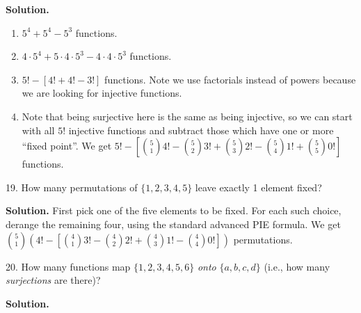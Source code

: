 \documentclass[10pt,]{book}
\theoremstyle{plain}
\theoremstyle{definition}
\theoremstyle{definition}
\theoremstyle{definition}
\numberwithin{equation}{section}
\begin{document}
\begin{exerciselist}
\par\smallskip
\par\smallskip
\noindent\textbf{Solution.}\hypertarget{solution-170}{}\quad

          \leavevmode%
\begin{enumerate}[label=(\alph*)]
\item\hypertarget{li-757}{}\(5^4 + 5^4 - 5^3\) functions. %
\item\hypertarget{li-758}{}\(4\cdot 5^4 + 5 \cdot 4 \cdot 5^3 - 4 \cdot 4 \cdot 5^3\) functions.%
\item\hypertarget{li-759}{}\(5! - \left[ 4! + 4! - 3! \right]\) functions.  Note we use factorials instead of powers because we are looking for injective functions.%
\item\hypertarget{li-760}{}Note that being surjective here is the same as being injective, so we can start with all \(5!\) injective functions and subtract those which have one or more ``fixed point''.  We get \(5! - \left[{5 \choose 1}4! - {5 \choose 2}3! + {5 \choose 3}2! - {5 \choose 4}1! + {5 \choose 5} 0!\right]\) functions.%
\end{enumerate}

\item[19.]\hypertarget{exercise-120}{}
            How many permutations of \(\{1,2,3,4,5\}\) leave exactly 1 element fixed?
\par\smallskip
\par\smallskip
\noindent\textbf{Solution.}\hypertarget{solution-171}{}\quad
 First pick one of the five elements to be fixed.  For each such choice, derange the remaining four, using the standard advanced PIE formula.  We get
            \({5 \choose 1}\left( 4! - \left[{4 \choose 1}3! - {4 \choose 2}2! + {4 \choose 3} 1! - {4 \choose 4} 0!\right] \right)\) permutations.
\item[20.]\hypertarget{exercise-121}{}
            How many functions map \(\{1,2,3,4,5,6\}\) \emph{onto} \(\{a,b,c,d\}\) (i.e., how many \emph{surjections} are there)?
\par\smallskip
\par\smallskip
\noindent\textbf{Solution.}\hypertarget{solution-172}{}\quad


\end{exerciselist}
\end{document}
